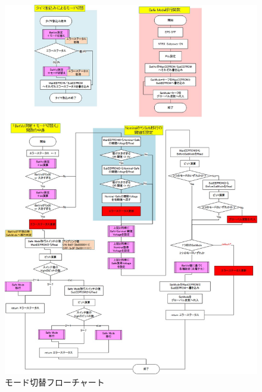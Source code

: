 \begin{figure}[H]
	\centering
	\includegraphics[scale=0.9]{03/fig/3-4-2-3.jpg}
	\caption{モード切替フローチャート}
	\label{fig:3-4-2-3}
\end{figure}

